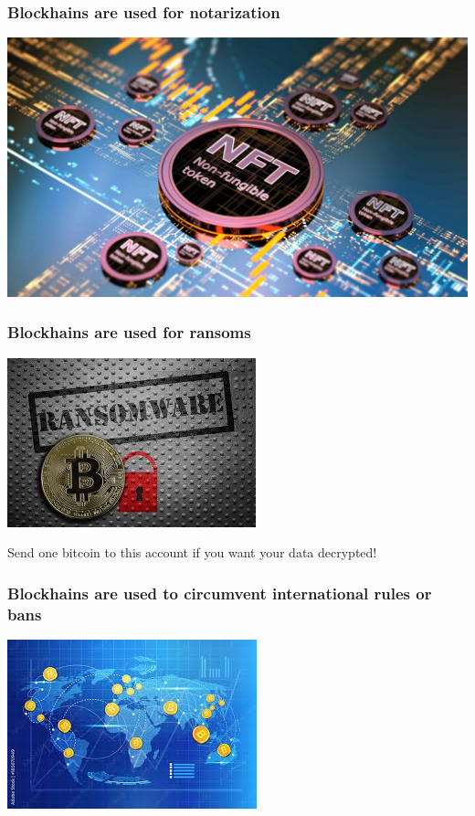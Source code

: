 \documentclass[11pt]{beamer}  %
\begin{document}
\begin{frame}\frametitle{Blockhains are used for notarization}

  \begin{center}
    \includegraphics[scale=0.258,clip=false]{pictures/nft.jpg}
  \end{center}

\end{frame}

\begin{frame}\frametitle{Blockhains are used for ransoms}

  \begin{center}
    \includegraphics[scale=0.7, clip=false]{pictures/ransom.jpg}
  \end{center}

  \begin{redbox}{}
    Send one bitcoin to this account if you want your data decrypted!
  \end{redbox}

\end{frame}

\begin{frame}\frametitle{Blockhains are used to circumvent international rules or bans}

  \begin{center}
    \includegraphics[scale=1, clip=false]{pictures/send-money.jpg}
  \end{center}

\end{frame}
\end{document}
